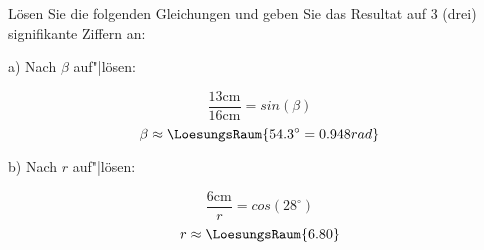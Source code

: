 

\begin{frage}[2]
	Lösen Sie die folgenden Gleichungen und geben Sie das Resultat auf 3
  (drei) signifikante Ziffern an:

  a) Nach $\beta$ auf"|lösen:

    $$\frac{13\textrm{cm}}{16\textrm{cm}} = sin(\beta)$$
    \vspace{7mm}
  $$ \beta \approx \LoesungsRaum{54.3^\circ = 0.948 rad}$$


        
  b) Nach $r$ auf"|lösen:

  $$\frac{6\textrm{cm}}{r} = cos(28^\circ)$$
  \vspace{7mm}
  $$ r \approx \LoesungsRaum{6.80}$$


  
\end{frage}
